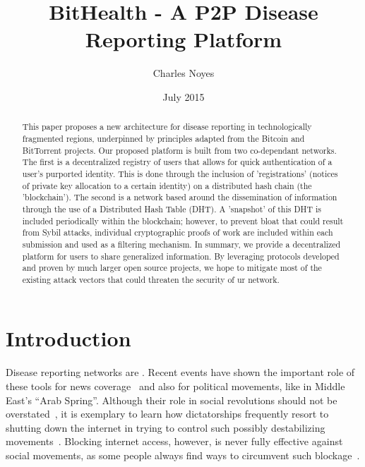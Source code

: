 \documentclass{article}
\title{BitHealth - A P2P Disease Reporting Platform}
\author{Charles Noyes}
\date{July 2015}
\begin{document}
\maketitle

\begin{abstract}
This paper proposes a new architecture for disease reporting in technologically fragmented regions, underpinned by principles adapted from the Bitcoin and BitTorrent projects. Our proposed platform is built from two co-dependant networks. The first is a decentralized registry of users that allows for quick authentication of a user's purported identity. This is done through the inclusion of 'registrations' (notices of private key allocation to a certain identity) on a distributed hash chain (the 'blockchain'). The second is a network based around the dissemination of information through the use of a Distributed Hash Table (DHT). A 'snapshot' of this DHT is included periodically within the blockchain; however, to prevent bloat that could result from Sybil attacks, individual cryptographic proofs of work are included within each submission and used as a filtering mechanism. In summary, we provide a decentralized platform for users to share generalized information. By leveraging protocols developed and proven by much larger open source projects, we hope to mitigate most of the existing attack vectors that could threaten the security of ur network.
\end{abstract}


\maketitle

\section{Introduction}
Disease reporting networks are . Recent events have shown the important role of these tools for news coverage~\cite{sklar2009} and also for political movements, like in Middle East's ``Arab Spring''. Although their role in social revolutions should not be overstated~\cite{khondker2011role}, it is exemplary to learn how dictatorships frequently resort to shutting down the internet in trying to control such possibly destabilizing movements~\cite{glanz2011,warner2012}. Blocking internet access, however, is never fully effective against social movements, as some people always find ways to circumvent such blockage~\cite{dachis2011}.
\end{document}

